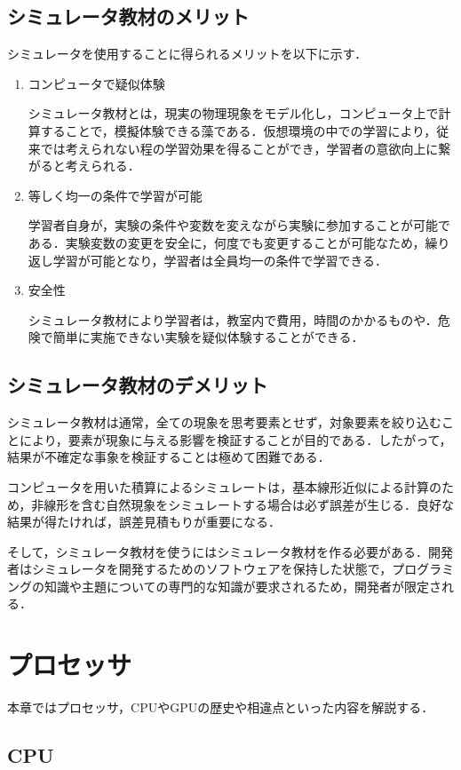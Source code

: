 \documentclass[a4j,12pt]{jsarticle}
\begin{document}
\subsection{シミュレータ教材のメリット}
シミュレータを使用することに得られるメリットを以下に示す．
\begin{enumerate}
\item コンピュータで疑似体験

シミュレータ教材とは，現実の物理現象をモデル化し，コンピュータ上で計算することで，模擬体験できる藻である．仮想環境の中での学習により，従来では考えられない程の学習効果を得ることができ，学習者の意欲向上に繋がると考えられる．
\item 等しく均一の条件で学習が可能

学習者自身が，実験の条件や変数を変えながら実験に参加することが可能である．実験変数の変更を安全に，何度でも変更することが可能なため，繰り返し学習が可能となり，学習者は全員均一の条件で学習できる．
\item 安全性

シミュレータ教材により学習者は，教室内で費用，時間のかかるものや．危険で簡単に実施できない実験を疑似体験することができる．
\end{enumerate}

\subsection{シミュレータ教材のデメリット}
シミュレータ教材は通常，全ての現象を思考要素とせず，対象要素を絞り込むことにより，要素が現象に与える影響を検証することが目的である．したがって，結果が不確定な事象を検証することは極めて困難である．

コンピュータを用いた積算によるシミュレートは，基本線形近似による計算のため，非線形を含む自然現象をシミュレートする場合は必ず誤差が生じる．良好な結果が得たければ，誤差見積もりが重要になる．

そして，シミュレータ教材を使うにはシミュレータ教材を作る必要がある．開発者はシミュレータを開発するためのソフトウェアを保持した状態で，プログラミングの知識や主題についての専門的な知識が要求されるため，開発者が限定される．
\newpage
\section{プロセッサ}
本章ではプロセッサ，CPUやGPUの歴史や相違点といった内容を解説する．
\subsection{CPU}
\end{document}
